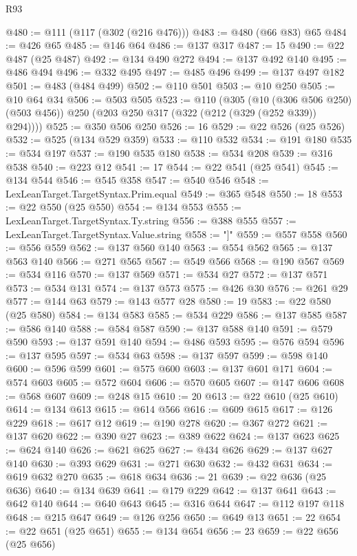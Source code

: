 \begin{lexlean}{R93}
\begin{coremodule}
@480 := @111 (@117 (@302 (@216 @476)))
@483 := @480 (@66 @83) @65
@484 := @426 @65
@485 := @146 @64
@486 := @137 @317
@487 := 15
@490 := @22 @487 (@25 @487)
@492 := @134 @490 @272
@494 := @137 @492 @140
@495 := @486 @494
@496 := @332 @495
@497 := @485 @496
@499 := @137 @497 @182
@501 := @483 (@484 @499)
@502 := @110 @501
@503 := @10 @250
@505 := @10 @64 @34
@506 := @503 @505
@523 := @110
    (@305
      (@10 (@306 @506 @250) (@503 @456))
      @250
      (@203 @250 @317 (@322 (@212 (@329 (@252 @339)) @294))))
@525 := @350 @506 @250
@526 := 16
@529 := @22 @526 (@25 @526)
@532 := @525 (@134 @529 @359)
@533 := @110 @532
@534 := @191 @180
@535 := @534 @197
@537 := @190 @535 @180
@538 := @534 @208
@539 := @316 @538
@540 := @223 @12
@541 := 17
@544 := @22 @541 (@25 @541)
@545 := @134 @544
@546 := @545 @358
@547 := @540 @546
@548 := LexLeanTarget.TargetSyntax.Prim.equal
@549 := @365 @548
@550 := 18
@553 := @22 @550 (@25 @550)
@554 := @134 @553
@555 := LexLeanTarget.TargetSyntax.Ty.string
@556 := @388 @555
@557 := LexLeanTarget.TargetSyntax.Value.string
@558 := "]"
@559 := @557 @558
@560 := @556 @559
@562 := @137 @560 @140
@563 := @554 @562
@565 := @137 @563 @140
@566 := @271 @565
@567 := @549 @566
@568 := @190 @567
@569 := @534 @116
@570 := @137 @569
@571 := @534 @27
@572 := @137 @571
@573 := @534 @131
@574 := @137 @573
@575 := @426 @30
@576 := @261 @29
@577 := @144 @63
@579 := @143 @577 @28
@580 := 19
@583 := @22 @580 (@25 @580)
@584 := @134 @583
@585 := @534 @229
@586 := @137 @585
@587 := @586 @140
@588 := @584 @587
@590 := @137 @588 @140
@591 := @579 @590
@593 := @137 @591 @140
@594 := @486 @593
@595 := @576 @594
@596 := @137 @595
@597 := @534 @63
@598 := @137 @597
@599 := @598 @140
@600 := @596 @599
@601 := @575 @600
@603 := @137 @601 @171
@604 := @574 @603
@605 := @572 @604
@606 := @570 @605
@607 := @147 @606
@608 := @568 @607
@609 := @248 @15
@610 := 20
@613 := @22 @610 (@25 @610)
@614 := @134 @613
@615 := @614 @566
@616 := @609 @615
@617 := @126 @229
@618 := @617 @12
@619 := @190 @278
@620 := @367 @272
@621 := @137 @620
@622 := @390 @27
@623 := @389 @622
@624 := @137 @623
@625 := @624 @140
@626 := @621 @625
@627 := @434 @626
@629 := @137 @627 @140
@630 := @393 @629
@631 := @271 @630
@632 := @432 @631
@634 := @619 @632 @270
@635 := @618 @634
@636 := 21
@639 := @22 @636 (@25 @636)
@640 := @134 @639
@641 := @179 @229
@642 := @137 @641
@643 := @642 @140
@644 := @640 @643
@645 := @316 @644
@647 := @112 @197 @118
@648 := @215 @647
@649 := @126 @256
@650 := @649 @13
@651 := 22
@654 := @22 @651 (@25 @651)
@655 := @134 @654
@656 := 23
@659 := @22 @656 (@25 @656)

\end{coremodule}
\end{lexlean}
